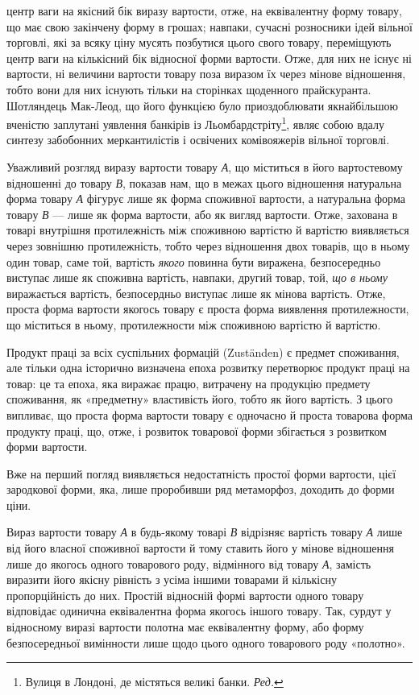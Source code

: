 \parcont{}  %
центр ваги на якісний бік виразу вартости, отже, на еквівалентну
форму товару, що має свою закінчену форму в грошах; навпаки,
сучасні розносники ідей вільної торговлі, які за всяку ціну мусять
позбутися цього свого товару, переміщують центр ваги на
кількісний бік відносної форми вартости. Отже, для них не існує
ні вартости, ні величини вартости товару поза виразом їх через
мінове відношення, тобто вони для них існують тільки на сторінках
щоденного прайскуранта. Шотляндець Мак-Леод, що його
функцією було приоздоблювати якнайбільшою вченістю заплутані
уявлення банкірів із Льомбардстріту\footnote*{
Вулиця в Лондоні, де містяться великі банки. \emph{Ред.}
}, являє собою вдалу синтезу
забобонних меркантилістів і освічених комівояжерів вільної
торговлі.

Уважливий розгляд виразу вартости товару \emph{А}, що міститься
в його вартостевому відношенні до товару \emph{В}, показав нам, що
в межах цього відношення натуральна форма товару \emph{А} фігурує
лише як форма споживної вартости, а натуральна форма товару
\emph{В} — лише як форма вартости, або як вигляд вартости. Отже,
захована в товарі внутрішня протилежність між споживною вартістю
й вартістю виявляється через зовнішню протилежність, тобто
через відношення двох товарів, що в ньому один товар, саме той,
вартість \emph{якого} повинна бути виражена, безпосередньо виступає
лише як споживна вартість, навпаки, другий товар, той, \emph{що в
ньому} виражається вартість, безпосердньо виступає лише як
мінова вартість. Отже, проста форма вартости якогось товару
є проста форма виявлення протилежности, що міститься в ньому,
протилежности між споживною вартістю й вартістю.

Продукт праці за всіх суспільних формацій (Zuständen) є
предмет споживання, але тільки одна історично визначена епоха
розвитку перетворює продукт праці на товар: це та епоха, яка
виражає працю, витрачену на продукцію предмету споживання,
як «предметну» властивість його, тобто як його вартість. З цього
випливає, що проста форма вартости товару є одночасно й проста
товарова форма продукту праці, що, отже, і розвиток товарової
форми збігається з розвитком форми вартости.

Вже на перший погляд виявляється недостатність простої
форми вартости, цієї зародкової форми, яка, лише проробивши
ряд метаморфоз, доходить до форми ціни.

Вираз вартости товару \emph{А} в будь-якому товарі \emph{В} відрізняє
вартість товару \emph{А} лише від його власної споживної вартости й
тому ставить його у мінове відношення лише до якогось одного
товарового роду, відмінного від товару \emph{А}, замість виразити його
якісну рівність з усіма іншими товарами й кількісну пропорційність
до них. Простій відносній формі вартости одного товару відповідає
одинична еквівалентна форма якогось іншого товару.
Так, сурдут у відносному виразі вартости полотна має еквівалентну
форму, або форму безпосередньої вимінности лише щодо
цього одного товарового роду «полотно».
